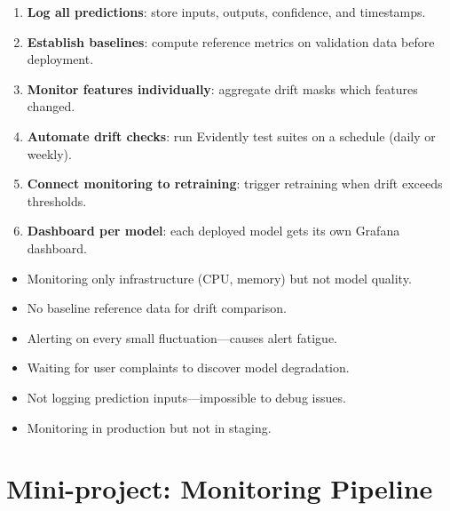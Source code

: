\begin{bestpractice}[title=\textbf{Monitoring best practices}]
\begin{enumerate}
  \item \textbf{Log all predictions}: store inputs, outputs,
    confidence, and timestamps.
  \item \textbf{Establish baselines}: compute reference metrics on
    validation data before deployment.
  \item \textbf{Monitor features individually}: aggregate drift masks
    which features changed.
  \item \textbf{Automate drift checks}: run Evidently test suites on
    a schedule (daily or weekly).
  \item \textbf{Connect monitoring to retraining}: trigger retraining
    when drift exceeds thresholds.
  \item \textbf{Dashboard per model}: each deployed model gets its
    own Grafana dashboard.
\end{enumerate}
\end{bestpractice}

\begin{antipattern}[title=\textbf{Monitoring anti-patterns}]
\begin{itemize}
  \item Monitoring only infrastructure (CPU, memory) but not model
    quality.
  \item No baseline reference data for drift comparison.
  \item Alerting on every small fluctuation---causes alert fatigue.
  \item Waiting for user complaints to discover model degradation.
  \item Not logging prediction inputs---impossible to debug issues.
  \item Monitoring in production but not in staging.
\end{itemize}
\end{antipattern}

\section{Mini-project: Monitoring Pipeline}
\label{sec:mini-project-ch10}

